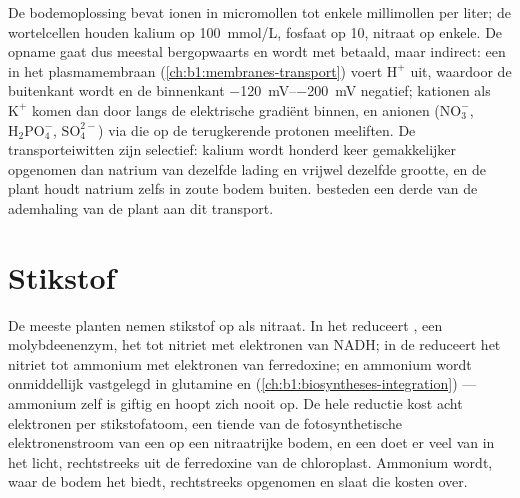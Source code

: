 \begin{proposition}\label{prop:b1:plant-water-minerals:uptake}
De bodemoplossing bevat ionen in micromollen tot enkele millimollen per
liter; de wortelcellen houden kalium op \qty{100}{mmol/L}, fosfaat op
\qty{10}{}, nitraat op enkele. De opname gaat dus meestal bergopwaarts en
wordt met  betaald, maar indirect: een \emph{} in het
plasmamembraan (\cref{ch:b1:membranes-transport}) voert
$\mathrm{H^+}$ uit, waardoor de buitenkant  wordt en de binnenkant
\qtyrange{-120}{-200}{mV} negatief; kationen als $\mathrm{K^+}$ komen dan
door  langs de elektrische gradiënt binnen, en anionen
($\mathrm{NO_3^-}$, $\mathrm{H_2PO_4^-}$, $\mathrm{SO_4^{2-}}$) via
 die op de terugkerende protonen meeliften. De transporteiwitten
zijn selectief: kalium wordt honderd keer gemakkelijker opgenomen dan
natrium van dezelfde lading en vrijwel dezelfde grootte, en de plant houdt
natrium zelfs in zoute bodem buiten.  besteden een derde van de
ademhaling van de plant aan dit transport.
\end{proposition}

\section{Stikstof}

\begin{proposition}\label{prop:b1:plant-water-minerals:nitrate}
De meeste planten nemen stikstof op als nitraat. In het  reduceert
\emph{}, een molybdeenenzym, het tot nitriet met elektronen
van NADH; in de  reduceert \emph{} het nitriet tot
ammonium met elektronen van ferredoxine; en ammonium wordt onmiddellijk
vastgelegd in glutamine en 
(\cref{ch:b1:biosyntheses-integration}) --- ammonium zelf is giftig en hoopt
zich nooit op. De hele reductie kost acht elektronen per stikstofatoom, een
tiende van de fotosynthetische elektronenstroom van een  op een
nitraatrijke bodem, en een  doet er veel van in het licht, rechtstreeks
uit de ferredoxine van de chloroplast. Ammonium wordt, waar de bodem het
biedt, rechtstreeks opgenomen en slaat die kosten over.
\end{proposition}

